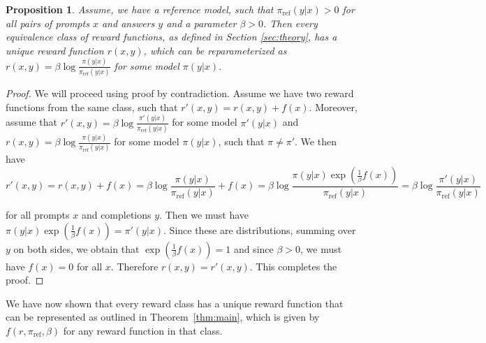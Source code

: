 \documentclass{article}
\newtheorem{proposition}{Proposition}
\newcommand{\piref}{\pi_\text{ref}}
\begin{document}
\begin{proposition}\label{prop:unique}
Assume, we have a reference model, such that $\piref(y|x)>0$ for all pairs of prompts $x$ and answers $y$ and a parameter $\beta>0$. Then every equivalence class of reward functions, as defined in Section \ref{sec:theory}, has a unique reward function $r(x, y)$, which can be reparameterized as $r(x, y) = \beta \log \frac{\pi(y|x)}{\piref(y|x)}$ for some model $\pi(y|x)$.
\end{proposition}
\begin{proof}
    We will proceed using proof by contradiction. Assume we have two reward functions from the same class, such that $r'(x, y) = r(x, y) + f(x)$. Moreover, assume that  $r'(x, y) = \beta \log \frac{\pi'(y|x)}{\piref(y|x)}$ for some model $\pi'(y|x)$ and  $r(x, y) = \beta \log \frac{\pi(y|x)}{\piref(y|x)}$ for some model $\pi(y|x)$, such that $\pi\neq\pi'$. We then have
\begin{equation*}
        r'(x, y) = r(x, y) + f(x) = \beta \log \frac{\pi(y|x)}{\piref(y|x)} + f(x) =  \beta \log \frac{\pi(y|x)\exp(\frac{1}{\beta} f(x))}{\piref(y|x)}=\beta \log \frac{\pi'(y|x)}{\piref(y|x)}
    \end{equation*}

    for all prompts $x$ and completions $y$. Then we must have $\pi(y|x)\exp(\frac{1}{\beta} f(x)) = \pi'(y|x)$. Since these are distributions, summing over $y$ on both sides, we obtain that $\exp(\frac{1}{\beta} f(x)) = 1$ and since $\beta>0$, we must have $f(x)=0$ for all $x$. Therefore $r(x,y) = r'(x,y)$. This completes the proof.
\end{proof}

We have now shown that every reward class has a unique reward function that can be represented as outlined in Theorem~\ref{thm:main}, which is given by $f(r, \piref, \beta)$ for any reward function in that class. 
\end{document}
